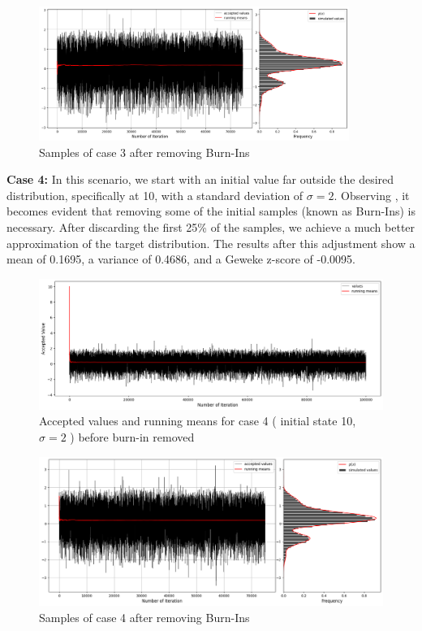 \begin{example}
    \begin{figure}[H]
        \centering
        \includegraphics[width=0.9\textwidth]{./images/metropolis/sample-3-value-hist-bo.png}
        \caption{Samples of case 3 after removing Burn-Ins}
        \label{fig:MH sample3 after burn in}
    \end{figure}

    \textbf{Case 4:} In this scenario, we start with an initial value far outside the desired distribution, specifically at 10, with a standard deviation of $\sigma = 2$. Observing , it becomes evident that removing some of the initial samples (known as Burn-Ins) is necessary. After discarding the first 25\% of the samples, we achieve a much better approximation of the target distribution. The results after this adjustment show a mean of 0.1695, a variance of 0.4686, and a Geweke z-score of -0.0095.

    \begin{figure}[H]
        \centering
        \includegraphics[width=1\textwidth]{./images/metropolis/sample-4-values.png}
        \caption{Accepted values and running means for case 4 ( initial state 10, $ \sigma = 2 $ ) before burn-in removed}
        \label{fig:MH sample4}
    \end{figure}

    \begin{figure}[H]
        \centering
        \includegraphics[width=1\textwidth]{./images/metropolis/sample-4-value-hist-bo.png}
        \caption{Samples of case 4 after removing Burn-Ins}
    \end{figure}


\end{example}
